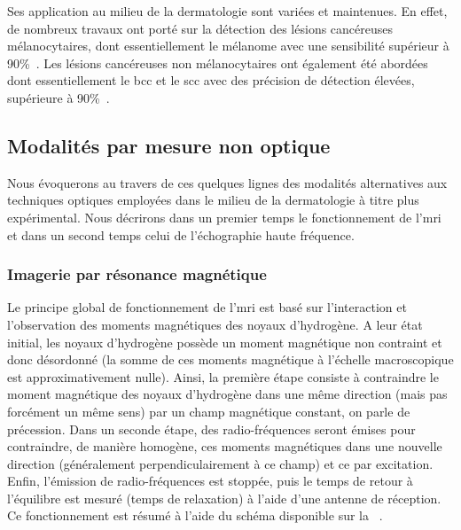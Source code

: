 Ses application au milieu de la dermatologie sont variées et maintenues. En effet, de nombreux travaux ont porté sur la détection des lésions cancéreuses mélanocytaires, dont essentiellement le mélanome avec une sensibilité supérieur à 90\%~\cite{Lui2012,Schleusener2015}. Les lésions cancéreuses non mélanocytaires ont également été abordées dont essentiellement le \gls{bcc} et le \gls{scc} avec des précision de détection élevées, supérieure à 90\%~\cite{Lieber2008,Silveira2015}.\par
\clearpage

\subsection{Modalités par mesure non optique}
Nous évoquerons au travers de ces quelques lignes des modalités alternatives aux techniques optiques employées dans le milieu de la dermatologie à titre plus expérimental. Nous décrirons dans un premier temps le fonctionnement de l'\gls{mri} et dans un second temps celui de l'échographie haute fréquence.\par

\subsubsection{Imagerie par résonance magnétique}
Le principe global de fonctionnement de l'\gls{mri} est basé sur l'interaction et l'observation des moments magnétiques des noyaux d'hydrogène. A leur état initial, les noyaux d'hydrogène possède un moment magnétique non contraint et donc désordonné (la somme de ces moments magnétique à l'échelle macroscopique est approximativement nulle). Ainsi, la première étape consiste à contraindre le moment magnétique des noyaux d'hydrogène dans une même direction (mais pas forcément un même sens) par un champ magnétique constant, on parle de précession. Dans un seconde étape, des radio-fréquences seront émises pour contraindre, de manière homogène, ces moments magnétiques dans une nouvelle direction (généralement perpendiculairement à ce champ) et ce par excitation. Enfin, l'émission de radio-fréquences est stoppée, puis le temps de retour à l'équilibre est mesuré (temps de relaxation) à l'aide d'une antenne de réception. Ce fonctionnement est résumé à l'aide du schéma disponible sur la ~.\par

